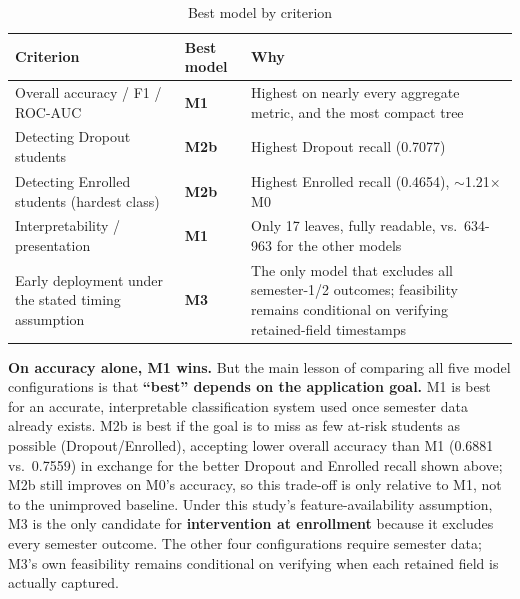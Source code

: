 \begin{table}[H]
  \centering
  \caption{Best model by criterion}
  \label{tab:g2}
  \begin{tabular}{@{}L{4.3cm}lL{6.3cm}@{}}
    \toprule
    Criterion & Best model & Why \\
    \midrule
    Overall accuracy / F1 / ROC-AUC & \textbf{M1} & Highest on nearly every aggregate metric, and the most compact tree \\
    Detecting Dropout students & \textbf{M2b} & Highest Dropout recall (0.7077) \\
    Detecting Enrolled students (hardest class) & \textbf{M2b} & Highest Enrolled recall (0.4654), $\sim$1.21$\times$ M0 \\
    Interpretability / presentation & \textbf{M1} & Only 17 leaves, fully readable, vs.\ 634-963 for the other models \\
    Early deployment under the stated timing assumption & \textbf{M3} & The only model that excludes all semester-1/2 outcomes; feasibility remains conditional on verifying retained-field timestamps \\
    \bottomrule
  \end{tabular}
\end{table}

\textbf{On accuracy alone, M1 wins.} But the main lesson of comparing all
five model configurations is that \textbf{``best'' depends on the application goal.} M1
is best for an accurate, interpretable classification system used once
semester data already exists. M2b is best if the goal is to miss as few
at-risk students as possible (Dropout/Enrolled), accepting lower overall
accuracy than M1 (0.6881 vs.\ 0.7559) in exchange for the better Dropout
and Enrolled recall shown above; M2b still improves on M0's accuracy, so
this trade-off is only relative to M1, not to the unimproved baseline.
Under this study's feature-availability assumption, M3 is the only candidate
for \textbf{intervention at enrollment} because it excludes every semester
outcome. The other four configurations require semester data; M3's own
feasibility remains conditional on verifying when each retained field is
actually captured.
